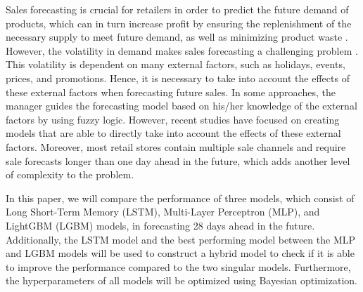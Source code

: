 Sales forecasting is crucial for retailers in order to predict the future demand of products, which can in turn increase profit by ensuring the replenishment of the necessary supply to meet future demand, as well as minimizing product waste \cite{c13}.
However, the volatility in demand makes sales forecasting a challenging problem \cite{c14}.
This volatility is dependent on many external factors, such as holidays, events, prices, and promotions.
Hence, it is necessary to take into account the effects of these external factors when forecasting future sales.
In some approaches, the manager guides the forecasting model based on his/her knowledge of the external factors by using fuzzy logic.
However, recent studies have focused on creating models that are able to directly take into account the effects of these external factors.
Moreover, most retail stores contain multiple sale channels and require sale forecasts longer than one day ahead in the future, which adds another level of complexity to the problem.

In this paper, we will compare the performance of three models, which consist of Long Short-Term Memory (LSTM), Multi-Layer Perceptron (MLP), and LightGBM (LGBM) models, in forecasting 28 days ahead in the future.
Additionally, the LSTM model and the best performing model between the MLP and LGBM models will be used to construct a hybrid model to check if it is able to improve the performance compared to the two singular models.
Furthermore, the hyperparameters of all models will be optimized using Bayesian optimization.